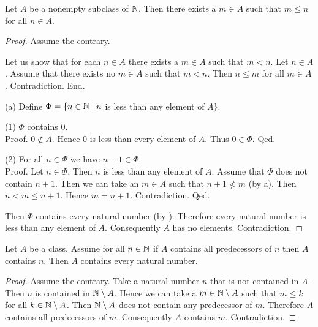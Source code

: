 \documentclass[10pt]{article}
\begin{document}
  \begin{forthel}
    \begin{proposition}[id=ARITHMETIC_04_272317502455808,printid]
      Let $A$ be a nonempty subclass of $\mathbb{N}$.
      Then there exists a $m \in A$ such that $m \leq n$ for all $n \in A$.
    \end{proposition}
    \begin{proof}
      Assume the contrary.

      Let us show that for each $n \in A$ there exists a $m \in A$ such that $m < n$.
        Let $n \in A$.
        Assume that there exists no $m \in A$ such that $m < n$.
        Then $n \leq m$ for all $m \in A$.
        Contradiction.
      End.

      (a) Define $\Phi = \{ n \in \mathbb{N} \mid n$ is less than any element of $A \}$.

      (1) $\Phi$ contains $0$. \\
      Proof.
        $0 \notin A$.
        Hence $0$ is less than every element of $A$.
        Thus $0 \in \Phi$.
      Qed.

      (2) For all $n \in \Phi$ we have $n + 1 \in \Phi$. \\
      Proof.
        Let $n \in \Phi$.
        Then $n$ is less than any element of $A$.
        Assume that $\Phi$ does not contain $n + 1$.
        Then we can take an $m \in A$ such that $n + 1 \nless m$ (by a).
        Then $n < m \leq n + 1$.
        Hence $m = n + 1$.
        Contradiction.
      Qed.

      Then $\Phi$ contains every natural number (by ).
      Therefore every natural number is less than any element of $A$.
      Consequently $A$ has no elements.
      Contradiction.
    \end{proof}
  \end{forthel}

  \begin{forthel}
    \begin{theorem}[id=ARITHMETIC_04_3609801697263616,printid]
      Let $A$ be a class.
      Assume for all $n \in \mathbb{N}$ if $A$ contains all predecessors of $n$ then $A$ contains $n$.
      Then $A$ contains every natural number.
    \end{theorem}
    \begin{proof}
      Assume the contrary.
      Take a natural number $n$ that is not contained in $A$.
      Then $n$ is contained in $\mathbb{N} \setminus A$.
      Hence we can take a $m \in \mathbb{N} \setminus A$ such that $m \leq k$ for all $k \in \mathbb{N} \setminus A$.
      Then $\mathbb{N} \setminus A$ does not contain any predecessor of $m$.
      Therefore $A$ contains all predecessors of $m$.
      Consequently $A$ contains $m$.
      Contradiction.
    \end{proof}
  \end{forthel}
\end{document}
